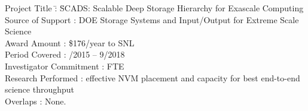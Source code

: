 \documentclass[10pt]{article}
\begin{document}
\begin{tabbing}
Project Title \hspace{5.5em}\=: \= SCADS: Scalable Deep Storage Hierarchy for Exascale Computing\\
Source of Support           \>: \> DOE Storage Systems and Input/Output for Extreme Scale Science\\
Award Amount                \>: \> \$176/year to SNL\\
Period Covered              \>: /2015 -- 9/2018\\
Investigator Commitment     \>:  FTE\\
Research Performed          \>: \> effective NVM placement and capacity for best end-to-end science throughput\\
Overlaps                    \>: \> None.\\
\end{tabbing}
\end{document}
